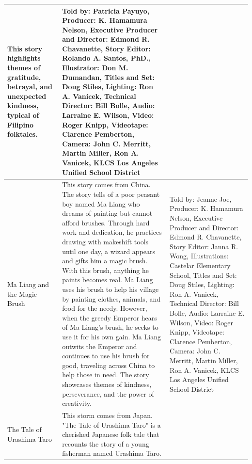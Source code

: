 \begin{table}[h]
\begin{small}
\begin{tabular}{|p{1.5cm}|p{8.5cm}|p{7cm}|}
            This story highlights themes of gratitude, betrayal, and unexpected kindness, typical of Filipino folktales.
                                 &
            Told by: Patricia Payuyo,
            Producer: K. Hamamura Nelson,
            Executive Producer and Director: Edmond R. Chavanette,
            Story Editor: Rolando A. Santos, PhD.,
            Illustrator: Don M. Dumandan,
            Titles and Set: Doug Stiles,
            Lighting: Ron A. Vanicek,
            Technical Director: Bill Bolle,
            Audio: Larraine E. Wilson,
            Video: Roger Knipp,
            Videotape: Clarence Pemberton,
            Camera: John C. Merritt, Martin Miller, Ron A. Vanicek,
            KLCS Los Angeles Unified School District
            \\
            \hline
            Ma Liang and the Magic Brush
                                 &
            This story comes from China. The story tells of a poor peasant boy named Ma Liang who dreams of painting but cannot afford brushes.
            Through hard work and dedication, he practices drawing with makeshift tools until one day, a wizard appears and gifts him a magic brush.
            With this brush, anything he paints becomes real. Ma Liang uses his brush to help his village by painting clothes, animals, and food for the needy.
            However, when the greedy Emperor hears of Ma Liang's brush, he seeks to use it for his own gain.
            Ma Liang outwits the Emperor and continues to use his brush for good, traveling across China to help those in need.
            The story showcases themes of kindness, perseverance, and the power of creativity.
                                 &
            Told by: Jeanne Joe,
            Producer: K. Hamamura Nelson,
            Executive Producer and Director: Edmond R. Chavanette,
            Story Editor: Janna R. Wong,
            Illustrations: Castelar Elementary School,
            Titles and Set: Doug Stiles,
            Lighting: Ron A. Vanicek,
            Technical Director: Bill Bolle,
            Audio: Larraine E. Wilson,
            Video: Roger Knipp,
            Videotape: Clarence Pemberton,
            Camera: John C. Merritt, Martin Miller, Ron A. Vanicek,
            KLCS Los Angeles Unified School District
            \\
            \hline
            The Tale of Urashima Taro
                                 &
            This storm comes from Japan. "The Tale of Urashima Taro" is a cherished Japanese folk tale that recounts the story of a young fisherman named Urashima Taro.

\end{tabular}
\end{small}
\end{table}

